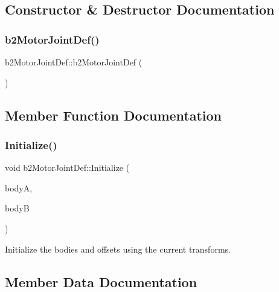 \subsection{Constructor \& Destructor Documentation}
\mbox{\label{structb2_motor_joint_def_a70c6d6e66090cef696f401df8ce89898}} 
\subsubsection{\texorpdfstring{b2MotorJointDef()}{b2MotorJointDef()}}
{\footnotesize\ttfamily b2\+Motor\+Joint\+Def\+::b2\+Motor\+Joint\+Def (\begin{DoxyParamCaption}{ }\end{DoxyParamCaption})\hspace{0.3cm}{\ttfamily [inline]}}



\subsection{Member Function Documentation}
\mbox{\label{structb2_motor_joint_def_a90eb924b6e04da8d75d9cefad0655960}} 
\subsubsection{\texorpdfstring{Initialize()}{Initialize()}}
{\footnotesize\ttfamily void b2\+Motor\+Joint\+Def\+::\+Initialize (\begin{DoxyParamCaption}\item[{\mbox{\hyperlink{classb2_body}{b2\+Body}} $\ast$}]{bodyA,  }\item[{\mbox{\hyperlink{classb2_body}{b2\+Body}} $\ast$}]{bodyB }\end{DoxyParamCaption})}



Initialize the bodies and offsets using the current transforms. 



\subsection{Member Data Documentation}
\mbox{\label{structb2_motor_joint_def_abdb42eff4aeff1d48038e084c57e1cb0}} 
